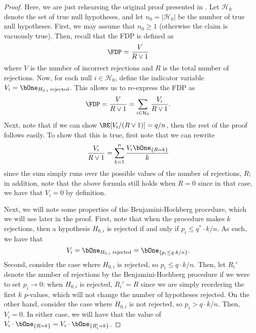 \begin{proof}
Here, we are just rehearsing the original proof presented in \cite{stat300}. Let $\mathcal{H}_0$ denote the set of true null hypotheses, and let $n_0 = |\mathcal{H}_0|$ be the number of true null hypotheses.  First, we may assume that $n_0 \geq 1$ (otherwise the claim is vacuously true). Then, recall that the FDP is defined as 
\[ \FDP = \frac{V}{R \vee 1} \] where $V$ is the number of incorrect rejections and $R$ is the total number of rejections. Now, for each null $i \in \mathcal{H}_0$, define the indicator variable $V_i = \bOne_{H_{0, i} \text{ rejected}}$. This allows us to re-express the FDP as
\[ \FDP = \frac{V}{R \vee 1} = \sum_{i \in \mathcal{H}_0} \frac{V_i}{R \vee 1}. \] 
Next, note that if we can show $\BE[ {V_i}/{(R \vee 1)}] = q / n$, then the rest of the proof follows easily. To show that this is true, first note that we can rewrite
\begin{equation}
\frac{V_i}{R \vee 1} = \sum_{k=1}^n \frac{V_i \bOne_{\{R = k\}}}{k}
\end{equation}
since the sum simply runs over the possible values of the number of rejections, $R$; in addition, note that the above formula still holds when $R = 0$ since in that case, we have that $V_i = 0$ by definition.

Next, we will note some properties of the Benjamini-Hochberg procedure, which we will use later in the proof. First, note that when the procedure makes $k$ rejections, then a hypothesis $H_{0, i}$ is rejected if and only if $p_i \leq q^* \cdot k / n$. As such, we have that
\begin{equation}
V_i =  \bOne_{H_{0, i} \text{ rejected}} = \bOne_{\{ p_i \leq q \cdot k / n \}}.
\end{equation}
Second, consider the case where $H_{0,i}$ is rejected, so $p_i \leq q \cdot k / n$. Then, let $R_i'$ denote the number of rejections by the Benjamini-Hochberg procedure if we were to set $p_i \to 0$: when $H_{0, i}$ is rejected, $R_i' = R$ since we are simply reordering the first $k$ $p$-values, which will not change the number of hypotheses rejected. On the other hand, consider the case where $H_{0,i}$ is not rejected, so $p_i > q \cdot k / n$. Then, $V_i = 0$. In either case, we will have that the value of $V_i \cdot \bOne_{\{R = k\}} = V_i \cdot \bOne_{\{ R_i' = k \}}$.


\end{proof}
